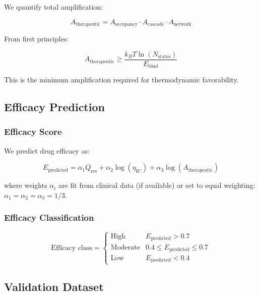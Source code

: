 \documentclass{article}
\begin{document}
We quantify total amplification:

\begin{equation}
A_{\text{therapeutic}} = A_{\text{occupancy}} \cdot A_{\text{cascade}} \cdot A_{\text{network}}
\end{equation}

From first principles:

\begin{equation}
A_{\text{therapeutic}} \geq \frac{k_B T \ln(N_{\text{states}})}{E_{\text{bind}}}
\end{equation}

This is the minimum amplification required for thermodynamic favorability.

\subsection{Efficacy Prediction}

\subsubsection{Efficacy Score}

We predict drug efficacy as:

\begin{equation}
\boxed{E_{\text{predicted}} = \alpha_1 Q_{\text{res}} + \alpha_2 \log(\eta_{\text{IC}}) + \alpha_3 \log(A_{\text{therapeutic}})}
\end{equation}

where weights $\alpha_i$ are fit from clinical data (if available) or set to equal weighting: $\alpha_1 = \alpha_2 = \alpha_3 = 1/3$.

\subsubsection{Efficacy Classification}

\begin{equation}
\text{Efficacy class} = \begin{cases}
\text{High} & E_{\text{predicted}} > 0.7 \\
\text{Moderate} & 0.4 \leq E_{\text{predicted}} \leq 0.7 \\
\text{Low} & E_{\text{predicted}} < 0.4
\end{cases}
\end{equation}

\subsection{Validation Dataset}
\end{document}
